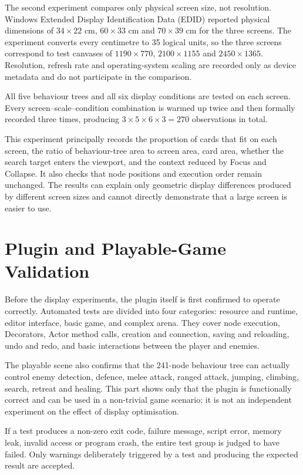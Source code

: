 The second experiment compares only physical screen size, not resolution. Windows Extended Display Identification Data (EDID) reported physical dimensions of \(34 \times 22\) cm, \(60 \times 33\) cm and \(70 \times 39\) cm for the three screens. The experiment converts every centimetre to 35 logical units, so the three screens correspond to test canvases of \(1190 \times 770\), \(2100 \times 1155\) and \(2450 \times 1365\). Resolution, refresh rate and operating-system scaling are recorded only as device metadata and do not participate in the comparison.

All five behaviour trees and all six display conditions are tested on each screen. Every screen--scale--condition combination is warmed up twice and then formally recorded three times, producing \(3 \times 5 \times 6 \times 3 = 270\) observations in total.

This experiment principally records the proportion of cards that fit on each screen, the ratio of behaviour-tree area to screen area, card area, whether the search target enters the viewport, and the context reduced by Focus and Collapse. It also checks that node positions and execution order remain unchanged. The results can explain only geometric display differences produced by different screen sizes and cannot directly demonstrate that a large screen is easier to use.

\section{Plugin and Playable-Game Validation}

Before the display experiments, the plugin itself is first confirmed to operate correctly. Automated tests are divided into four categories: resource and runtime, editor interface, basic game, and complex arena. They cover node execution, Decorators, Actor method calls, creation and connection, saving and reloading, undo and redo, and basic interactions between the player and enemies.

The playable scene also confirms that the 241-node behaviour tree can actually control enemy detection, defence, melee attack, ranged attack, jumping, climbing, search, retreat and healing. This part shows only that the plugin is functionally correct and can be used in a non-trivial game scenario; it is not an independent experiment on the effect of display optimisation.

If a test produces a non-zero exit code, failure message, script error, memory leak, invalid access or program crash, the entire test group is judged to have failed. Only warnings deliberately triggered by a test and producing the expected result are accepted.
